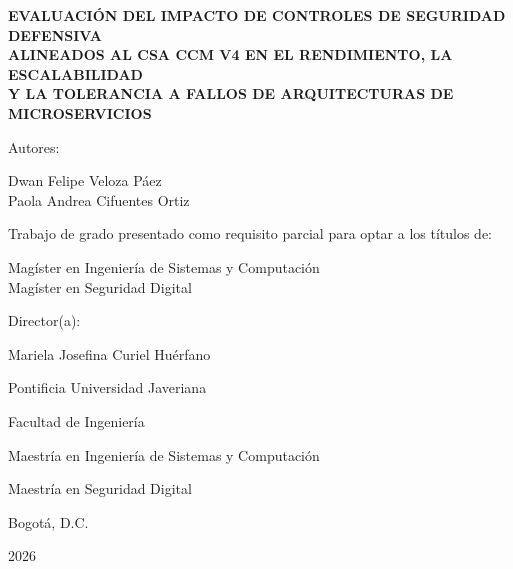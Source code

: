 \documentclass[12pt,letterpaper,fleqn]{report}
\begin{document}
\begin{titlepage}
    \centering
    \vspace*{1cm}

    {\normalsize\bfseries EVALUACIÓN DEL IMPACTO DE CONTROLES DE SEGURIDAD DEFENSIVA \\
    ALINEADOS AL CSA CCM V4 EN EL RENDIMIENTO, LA ESCALABILIDAD \\
    Y LA TOLERANCIA A FALLOS DE ARQUITECTURAS DE MICROSERVICIOS\par}

    \vspace{1.6cm}

    {\normalsize  Autores:\par}
    \vspace{0.5cm}
    {\normalsize  Dwan Felipe Veloza Páez\\
    Paola Andrea Cifuentes Ortiz\par}

    \vspace{1.6cm}

    {\normalsize  Trabajo de grado presentado como requisito parcial para optar a los títulos de:\par}
    \vspace{0.5cm}

    {\normalsize Magíster en Ingeniería de Sistemas y Computación\\
    Magíster en Seguridad Digital\par}
    
    \vspace{1.8cm}

    {\normalsize  Director(a):\par}
    {\normalsize  Mariela Josefina Curiel Huérfano\par}

    \vfill
    
    {\normalsize Pontificia Universidad Javeriana\par}
    {\normalsize Facultad de Ingeniería\par}
    {\normalsize Maestría en Ingeniería de Sistemas y Computación\par}
    {\normalsize Maestría en Seguridad Digital\par}
    {\normalsize Bogotá, D.C.\par}
    {\normalsize 2026\par}

\end{titlepage}
\end{document}
